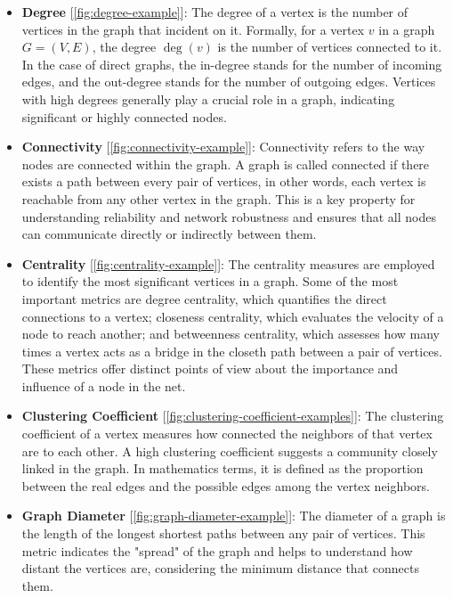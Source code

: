 \documentclass[../Thesis.tex]{subfiles}
\begin{document}
	\begin{itemize}
		\item \textbf{Degree} [\autoref{fig:degree-example}]: The degree of a vertex is the number of vertices in the graph that incident on it. Formally, for a vertex \( v \) in a graph \( G = (V, E) \), the degree \( \deg(v) \) is the number of vertices connected to it. In the case of direct graphs, the in-degree stands for the number of incoming edges, and the out-degree stands for the number of outgoing edges. Vertices with high degrees generally play a crucial role in a graph, indicating significant or highly connected nodes.
		
		
		
		\item \textbf{Connectivity} [\autoref{fig:connectivity-example}]: Connectivity refers to the way nodes are connected within the graph. A graph is called connected if there exists a path between every pair of vertices, in other words, each vertex is reachable from any other vertex in the graph. This is a key property for understanding reliability and network robustness and ensures that all nodes can communicate directly or indirectly between them.
		
		
		\item \textbf{Centrality} [\autoref{fig:centrality-example}]: The centrality measures are employed to identify the most significant vertices in a graph. Some of the most important metrics are degree centrality, which quantifies the direct connections to a vertex; closeness centrality, which evaluates the velocity of a node to reach another; and betweenness centrality, which assesses how many times a vertex acts as a bridge in the closeth path between a pair of vertices. These metrics offer distinct points of view about the importance and influence of a node in the net.
		
		
		\item \textbf{Clustering Coefficient} [\autoref{fig:clustering-coefficient-examples}]: The clustering coefficient of a vertex measures how connected the neighbors of that vertex are to each other. A high clustering coefficient suggests a community closely linked in the graph. In mathematics terms, it is defined as the proportion between the real edges and the possible edges among the vertex neighbors.
		
		
		\item \textbf{Graph Diameter} [\autoref{fig:graph-diameter-example}]: The diameter of a graph is the length of the longest shortest paths between any pair of vertices. This metric indicates the "spread" of the graph and helps to understand how distant the vertices are, considering the minimum distance that connects them.
		
		

\end{itemize}
\end{document}
